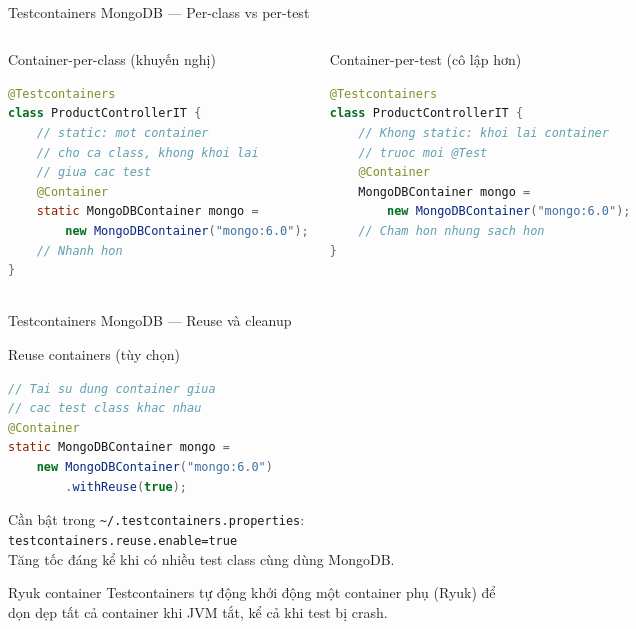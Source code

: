 \documentclass[aspectratio=169,10pt]{beamer}
\newcommand{\sref}[1]{\textsuperscript{\scriptsize\cite{#1}}}
\begin{document}
\begin{frame}[fragile]{Testcontainers MongoDB --- Per-class vs per-test\sref{testcontainers}}
  \begin{columns}
    \begin{block}{Container-per-class (khuyến nghị)}
\begin{lstlisting}[language=Java,style=small]
@Testcontainers
class ProductControllerIT {
    // static: mot container
    // cho ca class, khong khoi lai
    // giua cac test
    @Container
    static MongoDBContainer mongo =
        new MongoDBContainer("mongo:6.0");
    // Nhanh hon
}
\end{lstlisting}
    \end{block}

    \begin{block}{Container-per-test (cô lập hơn)}
\begin{lstlisting}[language=Java,style=small]
@Testcontainers
class ProductControllerIT {
    // Khong static: khoi lai container
    // truoc moi @Test
    @Container
    MongoDBContainer mongo =
        new MongoDBContainer("mongo:6.0");
    // Cham hon nhung sach hon
}
\end{lstlisting}
    \end{block}

  \end{columns}
\end{frame}

\begin{frame}[fragile]{Testcontainers MongoDB --- Reuse và cleanup\sref{testcontainers}}
    \begin{alertblock}{Reuse containers (tùy chọn)}
\begin{lstlisting}[language=Java,style=small]
// Tai su dung container giua
// cac test class khac nhau
@Container
static MongoDBContainer mongo =
    new MongoDBContainer("mongo:6.0")
        .withReuse(true);
\end{lstlisting}
      Cần bật trong \texttt{\textasciitilde{}/.testcontainers.properties}:\\
      \texttt{testcontainers.reuse.enable=true}\\[0.3em]
      Tăng tốc đáng kể khi có nhiều test class cùng dùng MongoDB.
    \end{alertblock}

    \begin{exampleblock}{Ryuk container}
      Testcontainers tự động khởi động một container phụ (Ryuk)
      để dọn dẹp tất cả container khi JVM tắt,
      kể cả khi test bị crash.
    \end{exampleblock}
\end{frame}
\end{document}
